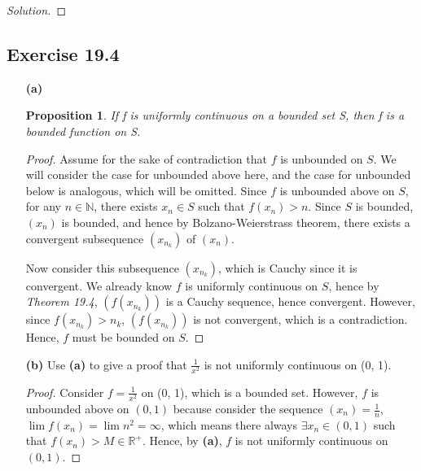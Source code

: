 \documentclass{article}
\newtheorem{proposition}[thm]{Proposition}
\newcommand*{\R}{\ensuremath{\mathbb{R}}}
\newcommand*{\N}{\ensuremath{\mathbb{N}}}
\begin{document}
\begin{proof}[Solution]
\end{proof}

\subsection*{Exercise 19.4}
\begin{enumerate}
    \item [\textbf{(a)}] 
    \begin{proposition}
        If f is uniformly continuous on a bounded set S, then f is a bounded function on 
        S.
    \end{proposition}
    \begin{proof}
        Assume for the sake of contradiction that $f$ is unbounded on $S$. We will consider the 
        case for unbounded above here, and the case for unbounded below is analogous, which will be 
        omitted. Since 
        $f$ is unbounded above on $S$, for any $n\in\N$, there exists $x_n\in S$ such that
        $f(x_n)>n$. Since $S$ is bounded, $(x_n)$ is bounded, and hence by Bolzano-Weierstrass
        theorem, there exists a convergent subsequence $(x_{n_k})$ of $(x_n)$.

        Now consider this subsequence $(x_{n_k})$, which is Cauchy since it is convergent. 
        We already know $f$ is uniformly continuous on $S$, hence by \emph{Theorem 19.4}, $(f(x_{n_k}))$
        is a Cauchy sequence, hence convergent. However, since $f(x_{n_k})>n_k$, $(f(x_{n_k}))$
        is not convergent, which is a contradiction. Hence, $f$ must be bounded on $S$.
    \end{proof}

    \newpage
    \item [\textbf{(b)}] Use \textbf{(a)} to give a proof that $\frac{1}{x^2}$ is not uniformly 
    continuous on (0, 1).
    \begin{proof}
        Consider $f=\frac{1}{x^2}$ on (0, 1), which is a bounded set. However, $f$ is unbounded 
        above on $(0, 1)$ because consider the sequence $(x_n)=\frac{1}{n}$, 
        $\lim f(x_n)=\lim n^2=\infty$, which means there always $\exists x_n\in (0,1)$
        such that $f(x_n)>M\in\R^+$. Hence, by \textbf{(a)}, $f$ is not uniformly continuous on
        $(0,1)$.
    \end{proof}
\end{enumerate}
\end{document}
